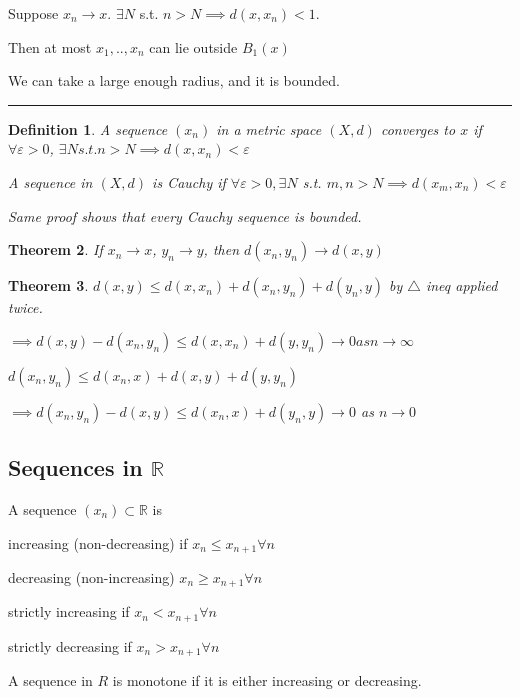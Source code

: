 \documentclass[twoside]{article}
\newcounter{lecnum}
\newtheorem{theorem}{Theorem}[lecnum]
\newtheorem{definition}[theorem]{Definition}
\newenvironment{proof}{{\bf Proof:}}{\hfill\rule{2mm}{2mm}}
\newcommand\R{\mathbb{R}}
\newcommand\ep{\varepsilon}
\begin{document}
\begin{proof}
    Suppose $x_n \rightarrow x$. $\exists N$ s.t. $n > N \implies d(x,x_n) < 1$.

    Then at most $x_1, .., x_n$ can lie outside $B_1(x)$

    We can take a large enough radius, and it is bounded. 
\end{proof}

\begin{definition}
    A sequence $(x_n)$ in a metric space $(X,d)$ converges to $x$ if $\forall \ep > 0$, $\exists N s.t. n > N \implies d(x,x_n) < \ep$


    A sequence in $(X,d)$ is Cauchy if $\forall \ep > 0, \exists N$ s.t. $m,n > N \implies d(x_m,x_n) < \ep$

    Same proof shows that every Cauchy sequence is bounded. 
\end{definition}

\begin{theorem}
    If $x_n \rightarrow x$, $y_n \rightarrow y$, then $d(x_n,y_n) \rightarrow d(x,y)$
\end{theorem}

\begin{theorem}
    $d(x,y) \leq d(x,x_n) + d(x_n,y_n) + d(y_n,y)$ by $\triangle$ ineq applied twice. 

    $\implies d(x,y) - d(x_n, y_n) \leq d(x,x_n) + d(y, y_n) \rightarrow 0 as n \rightarrow \infty$

    $d(x_n, y_n) \leq d(x_n, x) + d(x,y) + d(y,y_n)$

    $\implies d(x_n, y_n) - d(x,y) \leq d(x_n,x) + d(y_n, y) \rightarrow 0$ as $n \rightarrow 0$ 
\end{theorem}

\subsection{Sequences in $\R$}

A sequence $(x_n) \subset \R$ is 

increasing (non-decreasing) if $x_n \leq x_{n+1} \forall n$

decreasing (non-increasing) $x_n \geq x_{n+1} \forall n$


strictly increasing if $x_n < x_{n+1} \forall n$

strictly decreasing if $x_n > x_{n+1} \forall n$

A  sequence in $R$ is monotone if it is either increasing or decreasing. 
\end{document}
